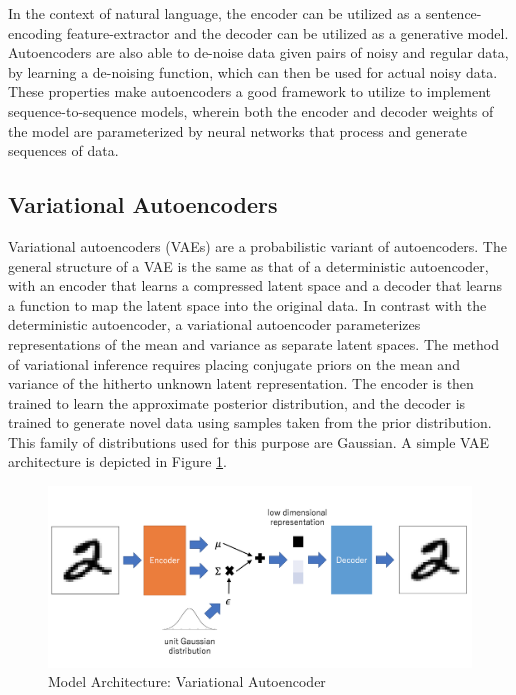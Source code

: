 In the context of natural language, the encoder can be utilized as a sentence-encoding feature-extractor and the decoder can be utilized as a generative model. Autoencoders are also able to de-noise data given pairs of noisy and regular data, by learning a de-noising function, which can then be used for actual noisy data. These properties make autoencoders a good framework to utilize to implement sequence-to-sequence models, wherein both the encoder and decoder weights of the model are parameterized by neural networks that process and generate sequences of data.

\subsection{Variational Autoencoders}

Variational autoencoders (VAEs) \citep{kingma2013auto} are a probabilistic variant of autoencoders. The general structure of a VAE is the same as that of a deterministic autoencoder, with an encoder that learns a compressed latent space and a decoder that learns a function to map the latent space into the original data. In contrast with the deterministic autoencoder, a variational autoencoder parameterizes representations of the mean and variance as separate latent spaces. The method of variational inference requires placing conjugate priors on the mean and variance of the hitherto unknown latent representation. The encoder is then trained to learn the approximate posterior distribution, and the decoder is trained to generate novel data using samples taken from the prior distribution. This family of distributions used for this purpose are Gaussian. A simple VAE architecture is depicted in Figure \ref{fig:vae-structure}.

\begin{figure}[ht]
	\centering
	\includegraphics[width=\textwidth]{images/vae-structure}
	\caption{\label{fig:vae-structure} Model Architecture: Variational Autoencoder}
\end{figure}

